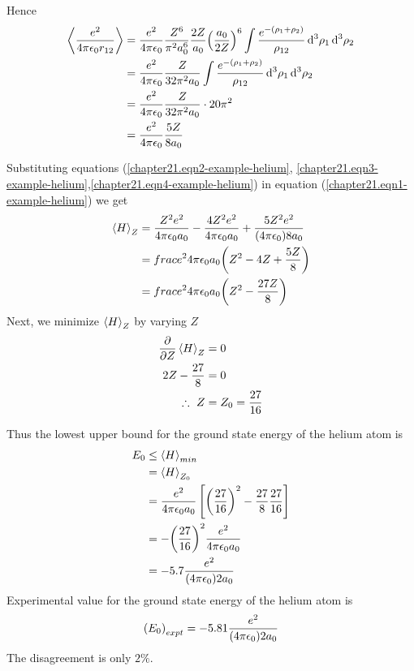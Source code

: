 	Hence
	\begin{align}
		\expval{\frac{e^2}{4\pi \epsilon_0 r_{1 2}}} &= \frac{e^2}{4\pi \epsilon_0}  \frac{Z^6}{\pi^2 a_0^6} \frac{2 Z}{a_0} \qty(\frac{a_0}{2 Z})^6  \int \frac{e^{-\qty(\rho_1 + \rho_2)}}{\rho_{12}} \dd[3]{\rho_1} \dd[3]{\rho_2} \nonumber\\
		&= \frac{e^2}{4\pi \epsilon_0} \frac{Z}{32 \pi^2 a_0} \int \frac{e^{-\qty(\rho_1 + \rho_2)}}{\rho_{12}} \dd[3]{\rho_1} \dd[3]{\rho_2} \nonumber\\
		&= \frac{e^2}{4\pi \epsilon_0} \frac{Z}{32 \pi^2 a_0} \cdot 20 \pi^2 \nonumber\\
		&= \frac{e^2}{4\pi \epsilon_0} \frac{5 Z}{8 a_0} 
		\label{chapter21.eqn4-example-helium}
	\end{align}
	
	Substituting equations (\ref{chapter21.eqn2-example-helium}, \ref{chapter21.eqn3-example-helium},\ref{chapter21.eqn4-example-helium}) in equation (\ref{chapter21.eqn1-example-helium}) we get
	\begin{align*}
		\expval{H}_Z 
		&= \frac{Z^2 e^2}{4\pi \epsilon_0 a_0} - \frac{4 Z^2 e^2}{4\pi \epsilon_0 a_0} + \frac{ 5 Z^2 e^2}{\qty(4\pi \epsilon_0) 8 a_0}\\
		&= frac{e^2}{4\pi \epsilon_0 a_0} \qty(Z^2 - 4 Z + \frac{5 Z}{8}) \\
		&= frac{e^2}{4\pi \epsilon_0 a_0} \qty(Z^2 - \frac{27 Z}{8})
	\end{align*}
	Next, we minimize $\expval{H}_Z$ by varying $Z$
	\begin{align*}
		\pdv{}{Z} \expval{H}_Z & = 0\\
		2 Z - \frac{27}{8} &= 0\\
	\therefore \	Z &= Z_0 = \frac{27}{16}
	\end{align*}
	
	Thus the lowest upper bound for the ground state energy of the helium atom is
	\begin{align*}
		E_0 &\leq \expval{H}_{min} \\
		&= \expval{H}_{Z_0}\\
		&= \frac{e^2}{4\pi \epsilon_0 a_0} \left[
		\qty(\frac{27}{16})^2 - \frac{27}{8} \frac{27}{16} \right]\\
		&= - \qty(\frac{27}{16})^2 \frac{e^2}{4\pi \epsilon_0 a_0} \\
		&= -5.7 \frac{e^2}{\qty(4\pi \epsilon_0) 2 a_0}		
	\end{align*}
	Experimental value for the ground state energy of the helium atom is
	\begin{equation*}
		\qty(E_0)_{expt} = - 5.81 \frac{e^2}{\qty(4\pi \epsilon_0) 2 a_0}
	\end{equation*}
	The disagreement is only $2\%$.\\
	
